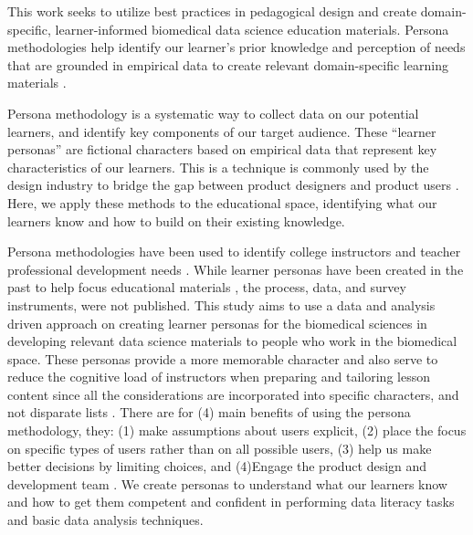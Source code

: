 \documentclass[020-persona\_validation.tex]{subfiles}
\begin{document}
    This work seeks to utilize best practices in pedagogical design and create domain-specific,
    learner-informed biomedical data science education materials.
    Persona methodologies help identify our learner's prior knowledge and perception of needs
    that are grounded in empirical data
    to create relevant domain-specific learning materials
    \cite{pruittPersonaLifecycleKeeping2006, zagallo2019through, schwartzParadoxChoiceWhy2016}.

    Persona methodology is a systematic way to collect data on our potential learners,
    and identify key components of our target audience.
    These ``learner personas'' are fictional characters based on empirical data that represent key characteristics
    of our learners.
    This is a technique is commonly used by the design industry to bridge the gap between product designers and product users
    \cite{pruittPersonaLifecycleKeeping2006, zagallo2019through, schwartzParadoxChoiceWhy2016}.
    Here, we apply these methods to the educational space,
    identifying what our learners know and how to build on their existing knowledge.

    Persona methodologies have been used to identify
    college instructors and teacher professional development needs
    \cite{zagallo2019through}.
    While learner personas have been created in the past to help focus educational materials
    \cite{RStudio2019, softwarecarpentryLearnerProfiles},
    the process, data, and survey instruments, were not published.
    This study aims to use a data and analysis driven approach on creating learner personas for the biomedical sciences
    in developing relevant data science materials to people who
    work in the biomedical space.
    These personas provide a more memorable character and also serve to reduce the cognitive load of instructors
    when preparing and tailoring lesson content since all the considerations are incorporated into specific characters,
    and not disparate lists
    \cite{pruittPersonaLifecycleKeeping2006, schwartzParadoxChoiceWhy2016, cooperInmatesAreRunning1999}.
    There are for (4) main benefits of using the persona methodology, they:
    (1) make assumptions about users explicit,
    (2) place the focus on specific types of users rather than on all possible users,
    (3) help us make better decisions by limiting choices, and
    (4)Engage the product design and development team
    \cite{pruittPersonaLifecycleKeeping2006, schwartzParadoxChoiceWhy2016}.
    We create personas to understand what our learners know and how to get them competent and confident
    in performing data literacy tasks and basic data analysis techniques.
\end{document}

